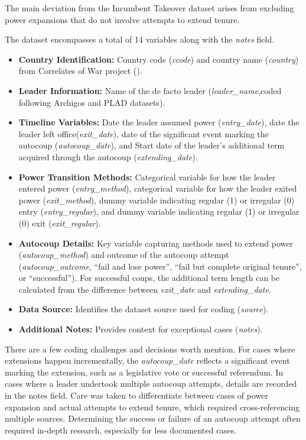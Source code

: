 \documentclass[
  12pt,
]{report}
\begin{document}
The main deviation from the Incumbent Takeover dataset arises from
excluding power expansions that do not involve attempts to extend
tenure.

The dataset encompasses a total of 14 variables along with the
\emph{notes} field.

\begin{itemize}
\item
  \textbf{Country Identification:} Country code (\emph{ccode}) and
  country name (\emph{country}) from Correlates of War project
  ().
\item
  \textbf{Leader Information:} Name of the de facto leader
  (\emph{leader\_name},coded following Archigos and PLAD datasets).
\item
  \textbf{Timeline Variables:} Date the leader assumed power
  (\emph{entry\_date}), date the leader left office(\emph{exit\_date}),
  date of the significant event marking the autocoup
  (\emph{autocoup\_date}), and Start date of the leader's additional
  term acquired through the autocoup (\emph{extending\_date}).
\item
  \textbf{Power Transition Methods:} Categorical variable for how the
  leader entered power (\emph{entry\_method}), categorical variable for
  how the leader exited power (\emph{exit\_method}), dummy variable
  indicating regular (1) or irregular (0) entry (\emph{entry\_regular}),
  and dummy variable indicating regular (1) or irregular (0) exit
  (\emph{exit\_regular}).
\item
  \textbf{Autocoup Details:} Key variable capturing methods used to
  extend power (\emph{autocoup\_method}) and outcome of the autocoup
  attempt (\emph{autocoup\_outcome}, ``fail and lose power'', ``fail but
  complete original tenure'', or ``successful''). For successful coups,
  the additional term length can be calculated from the difference
  between \emph{exit\_date} and \emph{extending\_date}.
\item
  \textbf{Data Source:} Identifies the dataset source used for coding
  (\emph{source}).
\item
  \textbf{Additional Notes:} Provides context for exceptional cases
  (\emph{notes}).
\end{itemize}

There are a few coding challenges and decisions worth mention. For cases
where extensions happen incrementally, the \emph{autocoup\_date}
reflects a significant event marking the extension, such as a
legislative vote or successful referendum. In cases where a leader
undertook multiple autocoup attempts, details are recorded in the notes
field. Care was taken to differentiate between cases of power expansion
and actual attempts to extend tenure, which required cross-referencing
multiple sources. Determining the success or failure of an autocoup
attempt often required in-depth research, especially for less documented
cases.
\end{document}
